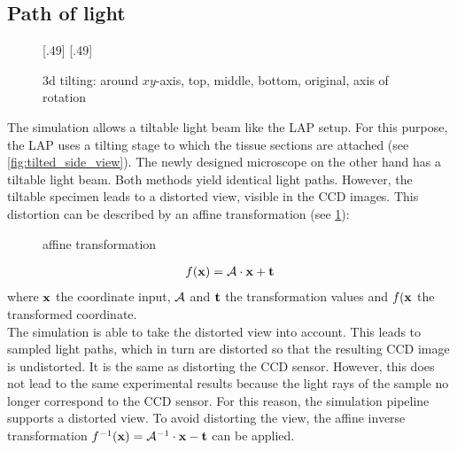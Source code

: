 \subsection{Path of light}
\label{sec:pathOfLight}
% 
\begin{figure}[!t]
\def\tikzheight{0.42\textwidth}
[.49\textwidth]{
}\hfill
{}[.49\textwidth]{
}
\tikzset{external/export=false}
\caption[3d tilting]{3d tilting: around $xy$-axis, \raisebox{.25em}{\tikz \draw[red,thick](0,0)--(0.25,0);} top, \raisebox{.25em}{\tikz \draw[green,thick](0,0)--(0.25,0);} middle, \raisebox{.25em}{\tikz \draw[blue,thick](0,0)--(0.25,0);} bottom, \raisebox{.25em}{\tikz \draw[dash pattern=on 1.25pt off 1.25pt,thick](0,0)--(0.25,0);} original, \raisebox{.25em}{\tikz \draw[gray](0,0)--(0.25,0);} axis of rotation }
\end{figure}
% 
The simulation allows a tiltable light beam like the \ac{LAP} setup.
For this purpose, the \ac{LAP} uses a tilting stage to which the tissue sections are attached (see \cref{fig:tilted_side_view}). 
The newly designed microscope on the other hand has a tiltable light beam.
Both methods yield identical light paths.
However, the tiltable specimen leads to a distorted view, visible in the \ac{CCD} images.
This distortion can be described by an affine transformation (see \cref{fig::affine_transformation}):
% 
\begin{figure}[!t]
\centering

\caption{affine transformation}
\label{fig::affine_transformation}
\end{figure}
% 
\begin{align}
f(\mathbf{x}) = \mathcal{A} \cdot \mathbf{x} + \mathbf{t}
\end{align}
where $\mathbf{x}$ the coordinate input, $\mathcal{A}$ and $\mathbf{t}$ the transformation values and $f(\mathbf{x}$ the transformed coordinate.
\\
% 
The simulation is able to take the distorted view into account.
This leads to sampled light paths, which in turn are distorted so that the resulting \ac{CCD} image is undistorted.
It is the same as distorting the \ac{CCD} sensor.
However, this does not lead to the same experimental results because the light rays of the sample no longer correspond to the \ac{CCD} sensor.
For this reason, the simulation pipeline supports a distorted view.
To avoid distorting the view, the affine inverse transformation $f^{-1}(\mathbf{x}) = \mathcal{A}^{-1} \cdot \mathbf{x} - \mathbf{t}$ can be applied.
